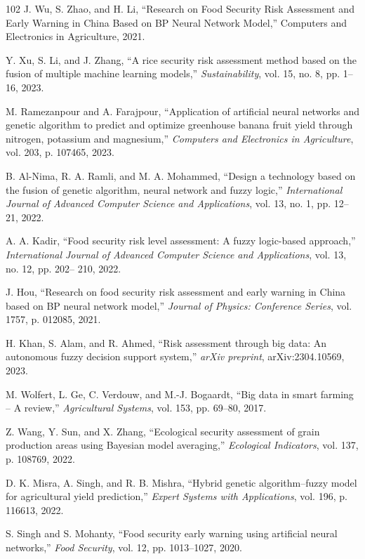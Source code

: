 \documentclass[preprint,12pt]{elsarticle}
\begin{document}
\begin{thebibliography}{102}
		J. Wu, S. Zhao, and H. Li, ``Research on Food Security Risk Assessment and Early Warning in China Based on BP Neural Network Model,'' Computers and Electronics in Agriculture, 2021.
		
		Y. Xu, S. Li, and J. Zhang, ``A rice security risk assessment method based on the fusion of multiple machine learning models,'' \emph{Sustainability}, vol. 15, no. 8, pp. 1--16, 2023.
		
		M. Ramezanpour and A. Farajpour, ``Application of artificial neural networks and genetic algorithm to predict and optimize greenhouse banana fruit yield through nitrogen, potassium and magnesium,'' \emph{Computers and Electronics in Agriculture}, vol. 203, p. 107465, 2023.
		
		B. Al-Nima, R. A. Ramli, and M. A. Mohammed, ``Design a technology based on the fusion of genetic algorithm, neural network and fuzzy logic,'' \emph{International Journal of Advanced Computer Science and Applications}, vol. 13, no. 1, pp. 12--21, 2022.
		
		A. A. Kadir, ``Food security risk level assessment: A fuzzy logic-based approach,'' \emph{International Journal of Advanced Computer Science and Applications}, vol. 13, no. 12, pp. 202-- 210, 2022.
		
		J. Hou, ``Research on food security risk assessment and early warning in China based on BP neural network model,'' \emph{Journal of Physics: Conference Series}, vol. 1757, p. 012085, 2021.
		
		H. Khan, S. Alam, and R. Ahmed, ``Risk assessment through big data: An autonomous fuzzy decision support system,'' \emph{arXiv preprint}, arXiv:2304.10569, 2023.
		
		M. Wolfert, L. Ge, C. Verdouw, and M.-J. Bogaardt, ``Big data in smart farming -- A review,'' \emph{Agricultural Systems}, vol. 153, pp. 69--80, 2017.
		
		Z. Wang, Y. Sun, and X. Zhang, ``Ecological security assessment of grain production areas using Bayesian model averaging,'' \emph{Ecological Indicators}, vol. 137, p. 108769, 2022.
		
		D. K. Misra, A. Singh, and R. B. Mishra, ``Hybrid genetic algorithm--fuzzy model for agricultural yield prediction,'' \emph{Expert Systems with Applications}, vol. 196, p. 116613, 2022.
		
		S. Singh and S. Mohanty, ``Food security early warning using artificial neural networks,'' \emph{Food Security}, vol. 12, pp. 1013--1027, 2020.
		

\end{thebibliography}
\end{document}
